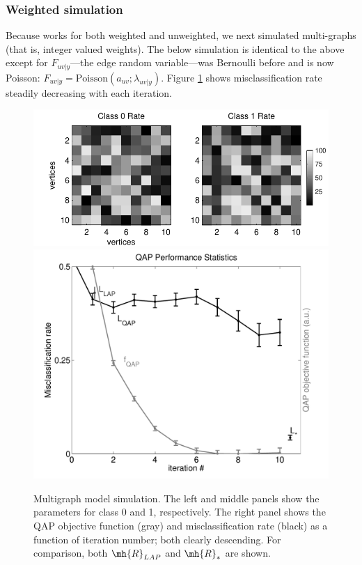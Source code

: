 \documentclass[10pt,journal,cspaper,compsoc]{IEEEtran}
\begin{document}


\subsubsection{Weighted simulation} %
\label{sub:heterogeneous_simulation}

Because \qapa works for both weighted and unweighted, we next simulated multi-graphs (that is, integer valued weights).  The below simulation is identical to the above except for $F_{uv|y}$---the edge random variable---was Bernoulli before and is now Poisson:  $F_{uv|y}=\text{Poisson}(a_{uv}; \lambda_{uv|y})$.  Figure \ref{fig:poiss} shows misclassification rate steadily decreasing with each iteration.

\begin{figure}[htbp]
	\centering			
	\includegraphics[width=1.0\linewidth]{../figs/poiss_model}
	\includegraphics[width=1.0\linewidth]{../figs/poiss_performance}
	\caption{Multigraph model simulation. The left and middle panels show the parameters for class 0 and  1, respectively.  The right panel shows the QAP objective function (gray) and misclassification rate (black) as a function of iteration number; both clearly descending.  For comparison, both $\mh{R}_{LAP}$ and $\mh{R}_*$ are shown.    }
	\label{fig:poiss}
\end{figure}
\end{document}
